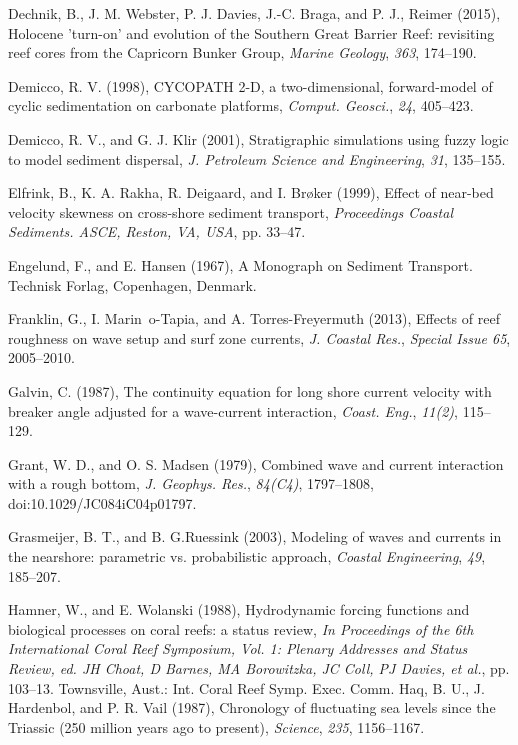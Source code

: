 \documentclass[default,jgrga]{agutex2015}
\begin{document}
\begin{article}
\begin{thebibliography}{}
Dechnik, B., J. M. Webster, P. J. Davies, J.-C. Braga, and P. J., Reimer (2015), Holocene 'turn-on' and evolution of the Southern Great Barrier Reef: revisiting reef cores from the Capricorn Bunker Group, \textit{Marine Geology}, \textit{363}, 174--190.

Demicco, R. V. (1998), CYCOPATH 2-D, a two-dimensional, forward-model of cyclic sedimentation on carbonate platforms, \textit{Comput. Geosci.}, \textit{24}, 405--423.

Demicco, R. V., and G. J. Klir (2001), Stratigraphic simulations using fuzzy logic to model sediment dispersal, \textit{J. Petroleum Science and Engineering}, \textit{31}, 135--155.

Elfrink, B., K. A. Rakha, R. Deigaard, and I. Br{\o}ker (1999), Effect of near-bed velocity skewness on cross-shore sediment transport,  \textit{Proceedings Coastal Sediments. ASCE, Reston, VA, USA}, pp. 33--47.

Engelund, F., and E. Hansen (1967), A Monograph on Sediment Transport. Technisk Forlag, Copenhagen, Denmark.

Franklin, G., I. Marin~o-Tapia, and A. Torres-Freyermuth (2013), Effects of reef roughness on wave setup and surf zone currents, \textit{J. Coastal Res.}, \textit{Special Issue 65}, 2005--2010.

Galvin, C. (1987), The continuity equation for long shore current velocity with breaker angle adjusted for a wave-current interaction, \textit{Coast. Eng.}, \textit{11(2)}, 115--129.

Grant, W. D., and O. S. Madsen (1979), Combined wave and current interaction with a rough bottom, \textit{J. Geophys. Res.}, \textit{84(C4)}, 1797--1808, doi:10.1029/JC084iC04p01797.

Grasmeijer, B. T., and B. G.Ruessink (2003), Modeling of waves and currents in the nearshore: parametric vs. probabilistic approach, \textit{Coastal Engineering}, \textit{49}, 185--207.

Hamner, W., and E. Wolanski (1988), Hydrodynamic forcing functions and biological processes on coral reefs: a status review, \textit{In Proceedings of the 6th International Coral Reef Symposium, Vol. 1: Plenary Addresses and Status Review, ed. JH Choat, D Barnes, MA Borowitzka, JC Coll, PJ Davies, et al.}, pp. 103--13. Townsville, Aust.: Int. Coral Reef Symp. Exec. Comm.
Haq, B. U., J. Hardenbol, and P. R. Vail (1987), Chronology of fluctuating sea levels since the Triassic (250 million years ago to present), \textit{Science}, \textit{235}, 1156--1167.


\end{thebibliography}
\end{article}
\end{document}
